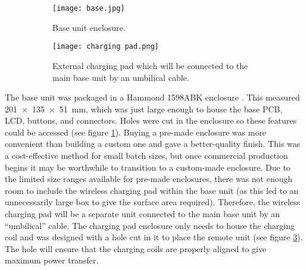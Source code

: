 \begin{figure}[htb]
	\centering
	\begin{subfigure}[t]{0.4\linewidth}
		\texttt{[image: base.jpg]}
		\caption{Base unit enclosure.}
		\label{fig: base enclosure}
	\end{subfigure}
	\begin{subfigure}[t]{0.4\linewidth}
		\texttt{[image: charging pad.png]}
		\caption{External charging pad which will be connected to the main base unit by an umbilical cable.}
		\label{fig: charging pad}
	\end{subfigure}
	\caption{}
\end{figure}

The base unit was packaged in a Hammond 1598ABK enclosure \cite{hammond}. This measured \SI{201x135x51}{\milli\metre}, which was just large enough to house the base PCB, LCD, buttons, and connectors. Holes were cut in the enclosure so these features could be accessed (see figure \ref{fig: base enclosure}). Buying a pre-made enclosure was more convenient than building a custom one and gave a better-quality finish. This was a cost-effective method for small batch sizes, but once commercial production begins it may be worthwhile to transition to a custom-made enclosure. Due to the limited size ranges available for pre-made enclosures, there was not enough room to include the wireless charging pad within the base unit (as this led to an unnecessarily large box to give the surface area required). Therefore, the wireless charging pad will be a separate unit connected to the main base unit by an ``umbilical'' cable. The charging pad enclosure only needs to house the charging coil and was designed with a hole cut in it to place the remote unit (see figure \ref{fig: charging pad}). The hole will ensure that the charging coils are properly aligned to give maximum power transfer.
